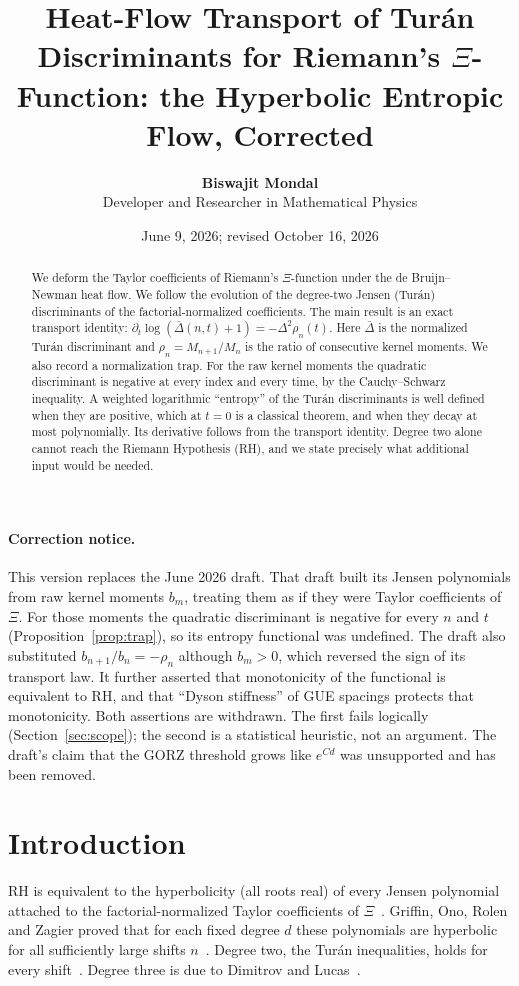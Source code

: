 \documentclass[11pt,a4paper]{article}
\title{\textbf{Heat-Flow Transport of Tur\'an Discriminants for Riemann's $\Xi$-Function: the Hyperbolic Entropic Flow, Corrected}}
\author{\textbf{Biswajit Mondal} \\ \small{Developer and Researcher in Mathematical Physics}}
\date{June 9, 2026; revised October 16, 2026}
\theoremstyle{remark}
\begin{document}
\maketitle

\begin{abstract}
We deform the Taylor coefficients of Riemann's $\Xi$-function under the de
Bruijn--Newman heat flow. We follow the evolution of the degree-two Jensen
(Tur\'an) discriminants of the factorial-normalized coefficients. The main
result is an exact transport identity:
$\partial_t\log(\bar\Delta(n,t)+1)=-\Delta^2\rho_n(t)$. Here $\bar\Delta$ is
the normalized Tur\'an discriminant and $\rho_n=M_{n+1}/M_n$ is the ratio of
consecutive kernel moments. We also record a normalization trap. For the raw
kernel moments the quadratic discriminant is negative at every index and
every time, by the Cauchy--Schwarz inequality. A weighted logarithmic
``entropy'' of the Tur\'an discriminants is well defined when they are
positive, which at $t=0$ is a classical theorem, and when they decay at most
polynomially. Its derivative follows from the transport identity. Degree two
alone cannot reach the Riemann Hypothesis (RH), and we state precisely what
additional input would be needed.
\end{abstract}

\paragraph{Correction notice.} This version replaces the June 2026 draft.
That draft built its Jensen polynomials from raw kernel moments $b_m$,
treating them as if they were Taylor coefficients of $\Xi$. For those
moments the quadratic discriminant is negative for every $n$ and $t$
(Proposition~\ref{prop:trap}), so its entropy functional was undefined. The
draft also substituted $b_{n+1}/b_n=-\rho_n$ although $b_m>0$, which reversed
the sign of its transport law. It further asserted that monotonicity of the
functional is equivalent to RH, and that ``Dyson stiffness'' of GUE spacings
protects that monotonicity. Both assertions are withdrawn. The first fails
logically (Section~\ref{sec:scope}); the second is a statistical heuristic,
not an argument. The draft's claim that the GORZ threshold grows like
$e^{Cd}$ was unsupported and has been removed.

\section{Introduction}
RH is equivalent to the hyperbolicity (all roots real) of every Jensen
polynomial attached to the factorial-normalized Taylor coefficients of
$\Xi$~\cite{Polya1927,Jensen1913}. Griffin, Ono, Rolen and Zagier proved
that for each fixed degree $d$ these polynomials are hyperbolic for all
sufficiently large shifts $n$~\cite{GORZ2019}. Degree two, the Tur\'an
inequalities, holds for every shift~\cite{CNV1986}. Degree three is due to
Dimitrov and Lucas~\cite{DimitrovLucas2011}.
\end{document}
